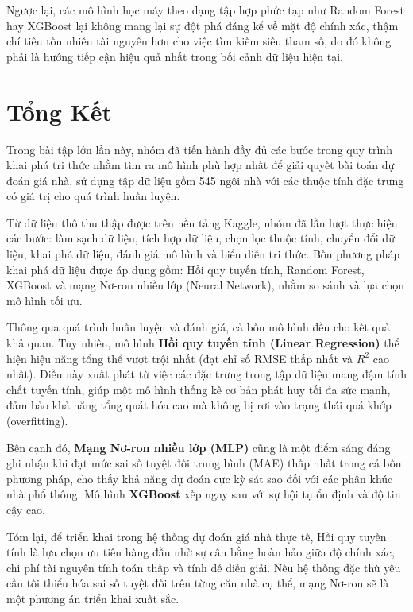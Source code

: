 Ngược lại, các mô hình học máy theo dạng tập hợp phức tạp như Random Forest hay XGBoost lại không mang lại sự đột phá đáng kể về mặt độ chính xác, thậm chí tiêu tốn nhiều tài nguyên hơn cho việc tìm kiếm siêu tham số, do đó không phải là hướng tiếp cận hiệu quả nhất trong bối cảnh dữ liệu hiện tại.

\section{Tổng Kết}
Trong bài tập lớn lần này, nhóm đã tiến hành đầy đủ các bước trong quy trình khai phá tri thức nhằm tìm ra mô hình phù hợp nhất để giải quyết bài toán dự đoán giá nhà, sử dụng tập dữ liệu gồm 545 ngôi nhà với các thuộc tính đặc trưng có giá trị cho quá trình huấn luyện.

Từ dữ liệu thô thu thập được trên nền tảng Kaggle, nhóm đã lần lượt thực hiện các bước: làm sạch dữ liệu, tích hợp dữ liệu, chọn lọc thuộc tính, chuyển đổi dữ liệu, khai phá dữ liệu, đánh giá mô hình và biểu diễn tri thức. Bốn phương pháp khai phá dữ liệu được áp dụng gồm: Hồi quy tuyến tính, Random Forest, XGBoost và mạng Nơ-ron nhiều lớp (Neural Network), nhằm so sánh và lựa chọn mô hình tối ưu.

Thông qua quá trình huấn luyện và đánh giá, cả bốn mô hình đều cho kết quả khả quan. Tuy nhiên, mô hình \textbf{Hồi quy tuyến tính (Linear Regression)} thể hiện hiệu năng tổng thể vượt trội nhất (đạt chỉ số RMSE thấp nhất và $R^2$ cao nhất). Điều này xuất phát từ việc các đặc trưng trong tập dữ liệu mang đậm tính chất tuyến tính, giúp một mô hình thống kê cơ bản phát huy tối đa sức mạnh, đảm bảo khả năng tổng quát hóa cao mà không bị rơi vào trạng thái quá khớp (overfitting). 

Bên cạnh đó, \textbf{Mạng Nơ-ron nhiều lớp (MLP)} cũng là một điểm sáng đáng ghi nhận khi đạt mức sai số tuyệt đối trung bình (MAE) thấp nhất trong cả bốn phương pháp, cho thấy khả năng dự đoán cực kỳ sát sao đối với các phân khúc nhà phổ thông. Mô hình \textbf{XGBoost} xếp ngay sau với sự hội tụ ổn định và độ tin cậy cao.

Tóm lại, để triển khai trong hệ thống dự đoán giá nhà thực tế, Hồi quy tuyến tính là lựa chọn ưu tiên hàng đầu nhờ sự cân bằng hoàn hảo giữa độ chính xác, chi phí tài nguyên tính toán thấp và tính dễ diễn giải. Nếu hệ thống đặc thù yêu cầu tối thiểu hóa sai số tuyệt đối trên từng căn nhà cụ thể, mạng Nơ-ron sẽ là một phương án triển khai xuất sắc.